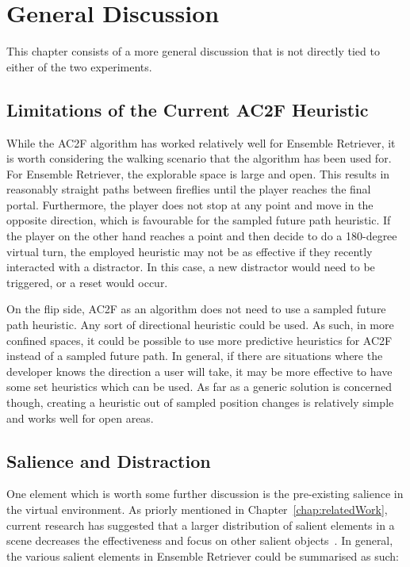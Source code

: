 \chapter{General Discussion}\label{chap:discussion}
This chapter consists of a more general discussion that is not directly tied to either of the two experiments. 

\section{Limitations of the Current AC2F Heuristic}
While the AC2F algorithm has worked relatively well for Ensemble Retriever, it is worth considering the walking scenario that the algorithm has been used for. For Ensemble Retriever, the explorable space is large and open. This results in reasonably straight paths between fireflies until the player reaches the final portal. Furthermore, the player does not stop at any point and move in the opposite direction, which is favourable for the sampled future path heuristic. If the player on the other hand reaches a point and then decide to do a 180-degree virtual turn, the employed heuristic may not be as effective if they recently interacted with a distractor. In this case, a new distractor would need to be triggered, or a reset would occur. 

On the flip side, AC2F as an algorithm does not need to use a sampled future path heuristic. Any sort of directional heuristic could be used. As such, in more confined spaces, it could be possible to use more predictive heuristics for AC2F instead of a sampled future path. In general, if there are situations where the developer knows the direction a user will take, it may be more effective to have some set heuristics which can be used. As far as a generic solution is concerned though, creating a heuristic out of sampled position changes is relatively simple and works well for open areas. 
   
\section{Salience and Distraction}
One element which is worth some further discussion is the pre-existing salience in the virtual environment. As priorly mentioned in Chapter~\ref{chap:relatedWork}, current research has suggested that a larger distribution of salient elements in a scene decreases the effectiveness and focus on other salient objects~\cite{sitzmann2018saliency}. In general, the various salient elements in Ensemble Retriever could be summarised as such:

